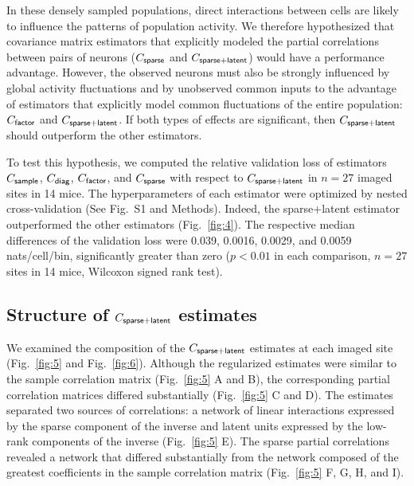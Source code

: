 In these densely sampled populations, direct interactions between cells are likely to influence the patterns of population activity.  We therefore hypothesized that covariance matrix estimators that explicitly modeled the partial correlations between pairs of neurons ($C_{\sf sparse}$ and $C_{\sf sparse+latent}$) would have a performance advantage.  However, the observed neurons must also be strongly influenced by global activity fluctuations and by unobserved common inputs to the advantage of estimators that explicitly model common fluctuations of the entire population: $C_{\sf factor}$ and $C_{\sf sparse+latent}$.  If both types of effects are significant, then $C_{\sf sparse+latent}$ should outperform the other estimators.

To test this hypothesis, we computed the relative validation loss of estimators  $C_{\sf sample}$, $C_{\sf diag}$, $C_{\sf factor}$, and $C_{\sf sparse}$ with respect to $C_{\sf sparse+latent}$ in $n=27$ imaged sites in 14 mice.  The hyperparameters of each estimator were optimized by nested cross-validation (See Fig.~S1 and  Methods). Indeed, the sparse+latent estimator outperformed the other estimators (Fig.~\ref{fig:4}). The respective median differences of the validation loss were 0.039, 0.0016, 0.0029, and 0.0059 nats/cell/bin, significantly greater than zero ($p<0.01$ in each comparison, $n=27$ sites in 14 mice, Wilcoxon signed rank test).

\subsection*{Structure of $C_{\sf sparse+latent}$ estimates}
We examined the composition of the $C_{\sf sparse+latent}$ estimates at each imaged site (Fig.~\ref{fig:5} and Fig.~\ref{fig:6}). Although the regularized estimates were similar to the sample correlation matrix (Fig.~\ref{fig:5} A and B), the corresponding partial correlation matrices differed substantially (Fig.~\ref{fig:5} C and D). The estimates separated two sources of correlations: a network of linear interactions expressed by the sparse component of the inverse and latent units expressed by the low-rank components of the inverse (Fig.~\ref{fig:5} E). The sparse partial correlations revealed a network that differed substantially from the network composed of the greatest coefficients in the sample correlation matrix (Fig.~\ref{fig:5} F, G, H, and I).

